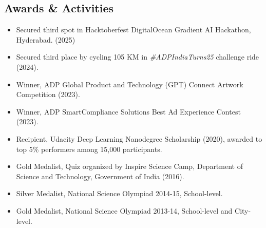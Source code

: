 \documentclass[letterpaper,10pt]{article}
\begin{document}
    \subsection{Awards \& Activities}
    \begin{itemize}[noitemsep, leftmargin=*]
        \item{Secured third spot in Hacktoberfest DigitalOcean Gradient AI Hackathon, Hyderabad. (2025)}
        \item{Secured third place by cycling 105 KM in \textit{\#ADPIndiaTurns25} challenge ride (2024).}
        \item{Winner, ADP Global Product and Technology (GPT) Connect Artwork Competition (2023).}
        \item{Winner, ADP SmartCompliance Solutions Best Ad Experience Contest (2023).}
        \item{Recipient, Udacity Deep Learning Nanodegree Scholarship (2020), awarded to top 5\% performers among 15,000 participants.}
        \item{Gold Medalist, Quiz organized by Inspire Science Camp, Department of Science and Technology, Government of India (2016).}
        \item{Silver Medalist, National Science Olympiad 2014-15, School-level.}
        \item{Gold Medalist, National Science Olympiad 2013-14, School-level and City-level.}
    \end{itemize}
\end{document}
